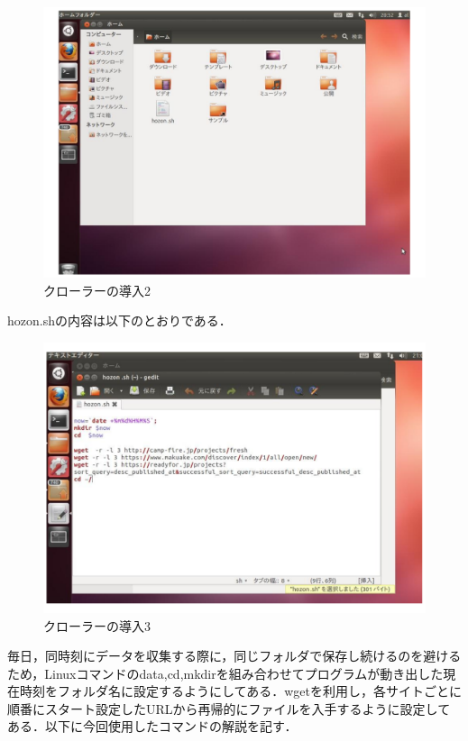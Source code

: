 \begin{figure}[H]
\centering
\includegraphics[width=13cm]{figure4.pdf}
\caption{クローラーの導入2}\label{sannp}
\end{figure}

hozon.shの内容は以下のとおりである．

\begin{figure}[H]
\centering
\includegraphics[width=13cm]{figure5.pdf}
\caption{クローラーの導入3}\label{sannp}
\end{figure}

毎日，同時刻にデータを収集する際に，同じフォルダで保存し続けるのを避けるため，Linuxコマンドのdata,cd,mkdirを組み合わせてプログラムが動き出した現在時刻をフォルダ名に設定するようにしてある．wgetを利用し，各サイトごとに順番にスタート設定したURLから再帰的にファイルを入手するように設定してある．以下に今回使用したコマンドの解説を記す．

